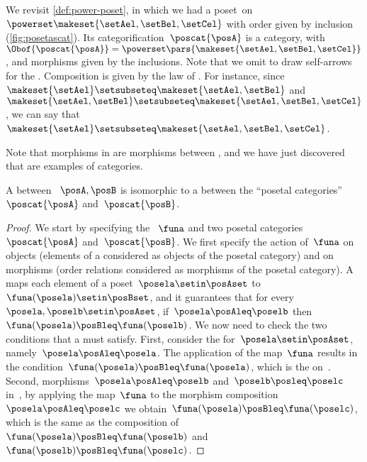 \begin{example}
    We revisit \cref{def:power-poset}, in which we had a poset~\posA on $\powerset \makeset{\setAel,\setBel,\setCel}$ with order given by inclusion (\cref{fig:posetascat}).
    Its categorification~$\poscat{\posA}$ is a category, with $\Obof{\poscat{\posA}}=\powerset\pars{\makeset{\setAel,\setBel,\setCel}}$, and morphisms given by the inclusions.
    Note that we omit to draw self-arrows for the .
    Composition is given by the  law of .
    For instance, since~$\makeset{\setAel}\setsubseteq \makeset{\setAel,\setBel}$ and~$\makeset{\setAel,\setBel} \setsubseteq \makeset{\setAel,\setBel,\setCel}$, we can say that~$\makeset{\setAel}\setsubseteq \makeset{\setAel,\setBel,\setCel}$.
\end{example}



Note that morphisms in \Pos are morphisms between , and we have just discovered that  are examples of categories.
\begin{lemma}
    \label{lem:posetfunctor}
    A  between ~$\posA,\posB$ is isomorphic to a  between the ``posetal categories''~$\poscat{\posA}$ and~$\poscat{\posB}$.
\end{lemma}
\begin{proof}
    We start by specifying the ~$\funa$ and two posetal categories~$\poscat{\posA}$ and~$\poscat{\posB}$.
    We first specify the action of~$\funa$ on objects (elements of a  considered as objects of the posetal category) and on morphisms (order relations considered as morphisms of the posetal category).
    A  maps each element of a poset~$\posela\setin \posAset$ to~$\funa(\posela) \setin \posBset$, and it guarantees that for every~$\posela,\poselb\setin \posAset$, if~$\posela\posAleq \poselb$ then~$\funa(\posela)\posBleq \funa(\poselb)$.
    We now need to check the two conditions that a  must satisfy.
    First, consider the  for~$\posela\setin \posAset$, namely~$\posela \posAleq \posela$.
    The application of the map~$\funa$ results in the condition~$\funa(\posela)\posBleq \funa(\posela)$, which is the  on~\posB.
    Second, morphisms~$\posela\posAleq \poselb$ and~$\poselb\posleq \poselc$ in~\posA, by applying the map~$\funa$ to the morphism composition~$\posela\posAleq \poselc$ we obtain~$\funa(\posela)\posBleq \funa(\poselc)$, which is the same as the composition of~$\funa(\posela)\posBleq \funa(\poselb)$ and~$\funa(\poselb)\posBleq \funa(\poselc)$.
\end{proof}

